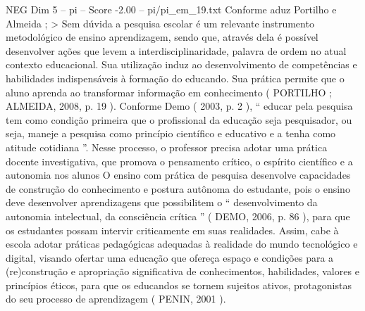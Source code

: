 \begin{textsample}{NEG Dim 5 – pi – Score -2.00 – pi/pi\_em\_19.txt}
Conforme aduz Portilho e Almeida ; > Sem dúvida a pesquisa escolar é um relevante instrumento metodológico de ensino aprendizagem, sendo que, através dela é possível desenvolver ações que levem a interdisciplinaridade, palavra de ordem no atual contexto educacional.
Sua utilização induz ao desenvolvimento de competências e habilidades indispensáveis à formação do educando.
Sua prática permite que o aluno aprenda ao transformar informação em conhecimento ( PORTILHO ; ALMEIDA, 2008, p. 19 ).
Conforme Demo ( 2003, p. 2 ), “ educar pela pesquisa tem como condição primeira que o profissional da educação seja pesquisador, ou seja, maneje a pesquisa como princípio científico e educativo e a tenha como atitude cotidiana ”.
Nesse processo, o professor precisa adotar uma prática docente investigativa, que promova o pensamento crítico, o espírito científico e a autonomia nos alunos O ensino com prática de pesquisa desenvolve capacidades de construção do conhecimento e postura autônoma do estudante, pois o ensino deve desenvolver aprendizagens que possibilitem o “ desenvolvimento da autonomia intelectual, da consciência crítica ” ( DEMO, 2006, p. 86 ), para que os estudantes possam intervir criticamente em suas realidades.
Assim, cabe à escola adotar práticas pedagógicas adequadas à realidade do mundo tecnológico e digital, visando ofertar uma educação que ofereça espaço e condições para a (re)construção e apropriação significativa de conhecimentos, habilidades, valores e princípios éticos, para que os educandos se tornem sujeitos ativos, protagonistas do seu processo de aprendizagem ( PENIN, 2001 ).

\end{textsample}
